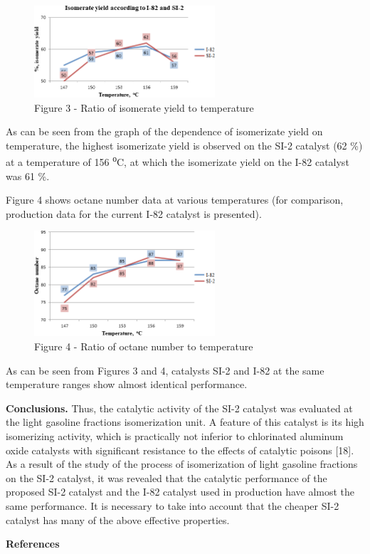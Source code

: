 \begin{figure}[H]
	\centering
	\includegraphics[width=0.6\textwidth]{assets/1056}
	\caption*{Figure 3 - Ratio of isomerate yield to temperature}
\end{figure}

\begin{multicols}{2}
As can be seen from the graph of the dependence of isomerizate yield on
temperature, the highest isomerizate yield is observed on the SI-2
catalyst (62 \%) at a temperature of 156 \textsuperscript{о}C, at which
the isomerizate yield on the I-82 catalyst was 61 \%.

Figure 4 shows octane number data at various temperatures (for
comparison, production data for the current I-82 catalyst is presented).
\end{multicols}

\begin{figure}[H]
	\centering
	\includegraphics[width=0.6\textwidth]{assets/1057}
	\caption*{Figure 4 - Ratio of octane number to temperature}
\end{figure}

\begin{multicols}{2}
As can be seen from Figures 3 and 4, catalysts SI-2 and I-82 at the same
temperature ranges show almost identical performance.

{\bfseries Conclusions.} Thus, the catalytic activity of the SI-2 catalyst
was evaluated at the light gasoline fractions isomerization unit. A
feature of this catalyst is its high isomerizing activity, which is
practically not inferior to chlorinated aluminum oxide catalysts with
significant resistance to the effects of catalytic poisons {[}18{]}. As
a result of the study of the process of isomerization of light gasoline
fractions on the SI-2 catalyst, it was revealed that the catalytic
performance of the proposed SI-2 catalyst and the I-82 catalyst used in
production have almost the same performance. It is necessary to take
into account that the cheaper SI-2 catalyst has many of the above
effective properties.
\end{multicols}
\newpage
\begin{center}
{\bfseries References}
\end{center}

